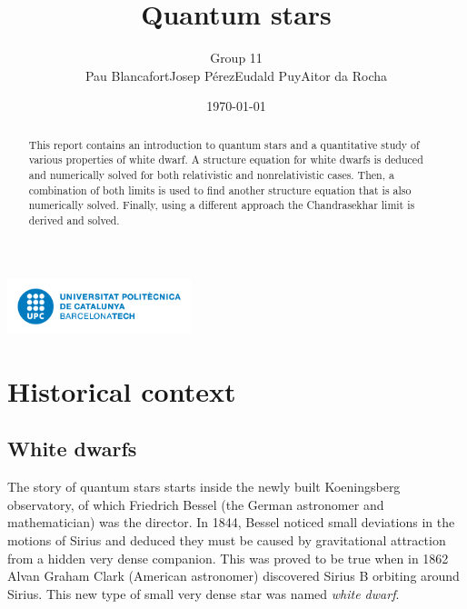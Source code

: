 \documentclass[a4paper]{article}
\title{Quantum stars}
\author{Group 11\\Pau Blancafort\quad Josep Pérez\quad Eudald Puy\quad Aitor da Rocha}
\date{\today}
\begin{document}

\maketitle

\begin{center}
\includegraphics[width=0.4\textwidth]{images/upclogo.png}
\end{center}
\bigskip

\begin{abstract}
    This report contains an introduction to quantum stars and a quantitative study of various properties of white dwarf. A structure equation for white dwarfs is deduced and numerically solved for both relativistic and nonrelativistic cases. Then, a combination of both limits is used to find another structure equation that is also numerically solved. Finally, using a different approach the Chandrasekhar limit is derived and solved.
\end{abstract}

\newpage

\tableofcontents

\newpage


\section{Historical context}
\subsection{White dwarfs}
The story of quantum stars starts inside the newly built Koeningsberg observatory, of which Friedrich Bessel (the German astronomer and mathematician) was the director. In 1844, Bessel noticed small deviations in the motions of Sirius and deduced they must be caused by gravitational attraction from a hidden very dense companion. This was proved to be true when in 1862 Alvan Graham Clark (American astronomer) discovered Sirius B orbiting around Sirius. This new type of small very dense star was named \textit{white dwarf}.
\end{document}
